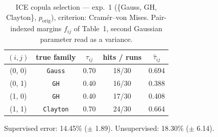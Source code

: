 \begin{table}[htbp]
  \centering
  \caption{ICE copula selection — exp.\ 1 (\{Gauss, GH, Clayton\}, $p_{\text{orig}}$), criterion: Cram\'er--von Mises. Pair-indexed margins $f_{ij}$ of Table~1, second Gaussian parameter read as a variance.}
  \label{tab:exp3-exp1_orig_p__cvm}
  \begin{tabular}{ccccc}
    \toprule
    $(i, j)$ & true family & $\tau_{ij}$ & hits / runs & $\hat\tau_{ij}$ \\
    \midrule
    (0, 0) & \texttt{Gauss} & 0.70 & 18/30 & 0.694 \\
    (0, 1) & \texttt{GH} & 0.40 & 16/30 & 0.388 \\
    (1, 0) & \texttt{GH} & 0.40 & 17/30 & 0.408 \\
    (1, 1) & \texttt{Clayton} & 0.70 & 24/30 & 0.664 \\
    \bottomrule
  \end{tabular}
  \par\smallskip Supervised error: 14.45\% ($\pm$ 1.89). Unsupervised: 18.30\% ($\pm$ 6.14).
\end{table}
